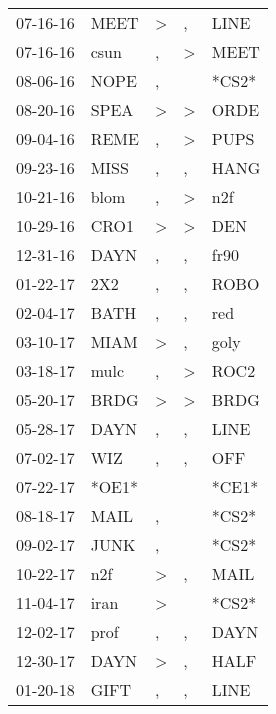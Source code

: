 \begin{supertabular}{lllll}
 07-16-16 &   MEET &     \textgreater &                , &   LINE \\
 07-16-16 &   csun &                , &     \textgreater &   MEET \\
 08-06-16 &   NOPE &                , &                  &  *CS2* \\
 08-20-16 &   SPEA &     \textgreater &     \textgreater &   ORDE \\
 09-04-16 &   REME &                , &     \textgreater &   PUPS \\
 09-23-16 &   MISS &                , &                , &   HANG \\
 10-21-16 &   blom &                , &     \textgreater &    n2f \\
 10-29-16 &   CRO1 &     \textgreater &     \textgreater &    DEN \\
 12-31-16 &   DAYN &                , &                , &   fr90 \\
 01-22-17 &    2X2 &                , &                , &   ROBO \\
 02-04-17 &   BATH &                , &                , &    red \\
 03-10-17 &   MIAM &     \textgreater &                , &   goly \\
 03-18-17 &   mulc &                , &     \textgreater &   ROC2 \\
 05-20-17 &   BRDG &     \textgreater &     \textgreater &   BRDG \\
 05-28-17 &   DAYN &                , &                , &   LINE \\
 07-02-17 &    WIZ &                , &                , &    OFF \\
 07-22-17 &  *OE1* &                  &                  &  *CE1* \\
 08-18-17 &   MAIL &                , &                  &  *CS2* \\
 09-02-17 &   JUNK &                , &                  &  *CS2* \\
 10-22-17 &    n2f &     \textgreater &                , &   MAIL \\
 11-04-17 &   iran &     \textgreater &                  &  *CS2* \\
 12-02-17 &   prof &                , &                , &   DAYN \\
 12-30-17 &   DAYN &     \textgreater &                , &   HALF \\
 01-20-18 &   GIFT &                , &                , &   LINE \\

\end{supertabular}
